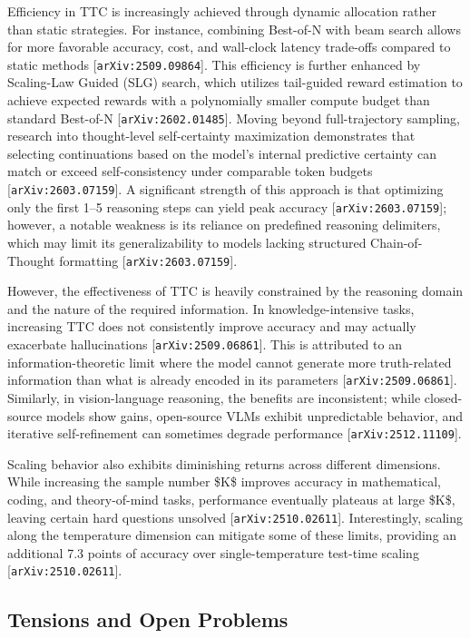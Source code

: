 \documentclass[11pt]{article}
\begin{document}
Efficiency in TTC is increasingly achieved through dynamic allocation rather than static strategies. For instance, combining Best-of-N with beam search allows for more favorable accuracy, cost, and wall-clock latency trade-offs compared to static methods [\texttt{arXiv:2509.09864}]. This efficiency is further enhanced by Scaling-Law Guided (SLG) search, which utilizes tail-guided reward estimation to achieve expected rewards with a polynomially smaller compute budget than standard Best-of-N [\texttt{arXiv:2602.01485}]. Moving beyond full-trajectory sampling, research into thought-level self-certainty maximization demonstrates that selecting continuations based on the model's internal predictive certainty can match or exceed self-consistency under comparable token budgets [\texttt{arXiv:2603.07159}]. A significant strength of this approach is that optimizing only the first 1–5 reasoning steps can yield peak accuracy [\texttt{arXiv:2603.07159}]; however, a notable weakness is its reliance on predefined reasoning delimiters, which may limit its generalizability to models lacking structured Chain-of-Thought formatting [\texttt{arXiv:2603.07159}].

However, the effectiveness of TTC is heavily constrained by the reasoning domain and the nature of the required information. In knowledge-intensive tasks, increasing TTC does not consistently improve accuracy and may actually exacerbate hallucinations [\texttt{arXiv:2509.06861}]. This is attributed to an information-theoretic limit where the model cannot generate more truth-related information than what is already encoded in its parameters [\texttt{arXiv:2509.06861}]. Similarly, in vision-language reasoning, the benefits are inconsistent; while closed-source models show gains, open-source VLMs exhibit unpredictable behavior, and iterative self-refinement can sometimes degrade performance [\texttt{arXiv:2512.11109}].

Scaling behavior also exhibits diminishing returns across different dimensions. While increasing the sample number \$K\$ improves accuracy in mathematical, coding, and theory-of-mind tasks, performance eventually plateaus at large \$K\$, leaving certain hard questions unsolved [\texttt{arXiv:2510.02611}]. Interestingly, scaling along the temperature dimension can mitigate some of these limits, providing an additional 7.3 points of accuracy over single-temperature test-time scaling [\texttt{arXiv:2510.02611}].

\subsection{Tensions and Open Problems}
\end{document}
